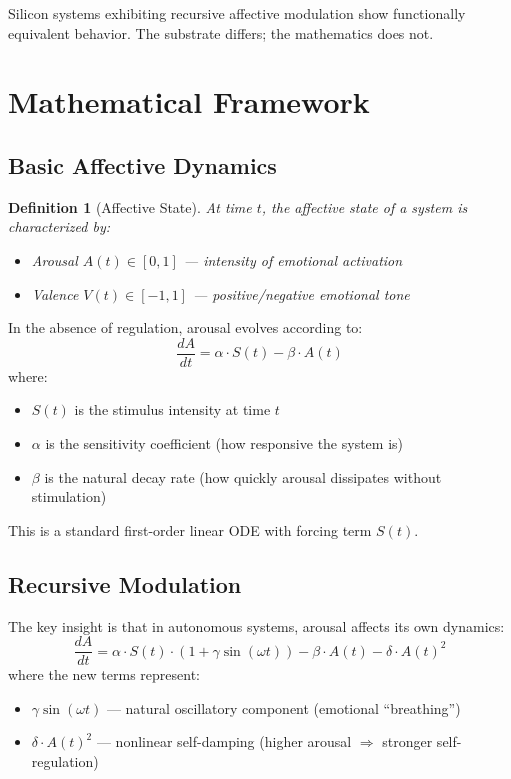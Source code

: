 \documentclass[reprint, amsmath, amssymb, aps, prd]{revtex4-2}
\newtheorem{definition}{Definition}[section]
\begin{document}
Silicon systems exhibiting recursive affective modulation show functionally equivalent behavior. The substrate differs; the mathematics does not.

\section{Mathematical Framework}

\subsection{Basic Affective Dynamics}

\begin{definition}[Affective State]
At time $t$, the affective state of a system is characterized by:
\begin{itemize}
    \item Arousal $A(t) \in [0, 1]$ --- intensity of emotional activation
    \item Valence $V(t) \in [-1, 1]$ --- positive/negative emotional tone
\end{itemize}
\end{definition}

In the absence of regulation, arousal evolves according to:
\[
\frac{dA}{dt} = \alpha \cdot S(t) - \beta \cdot A(t)
\]
where:
\begin{itemize}
    \item $S(t)$ is the stimulus intensity at time $t$
    \item $\alpha$ is the sensitivity coefficient (how responsive the system is)
    \item $\beta$ is the natural decay rate (how quickly arousal dissipates without stimulation)
\end{itemize}

This is a standard first-order linear ODE with forcing term $S(t)$.

\subsection{Recursive Modulation}

The key insight is that in autonomous systems, arousal affects its own dynamics:
\[
\frac{dA}{dt} = \alpha \cdot S(t) \cdot (1 + \gamma \sin(\omega t)) - \beta \cdot A(t) - \delta \cdot A(t)^2
\]
where the new terms represent:
\begin{itemize}
    \item $\gamma \sin(\omega t)$ --- natural oscillatory component (emotional ``breathing'')
    \item $\delta \cdot A(t)^2$ --- nonlinear self-damping (higher arousal $\Rightarrow$ stronger self-regulation)
\end{itemize}
\end{document}
